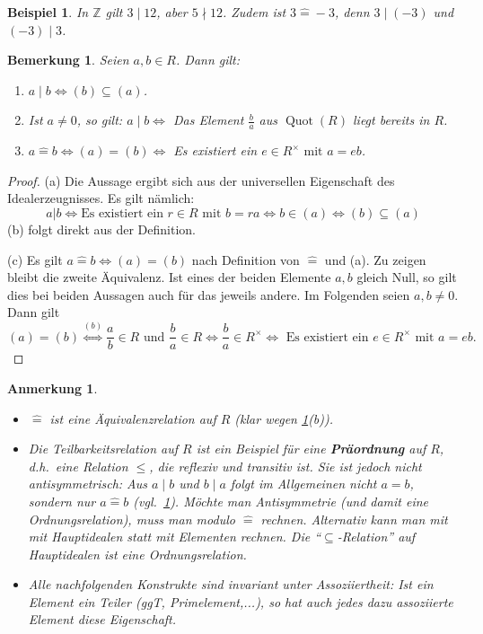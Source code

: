 \documentclass[a4paper, twoside, 11pt, ngerman]{report}
\newcommand{\ZZ}{\mathds Z}
\newcommand{\assoc}{\mathrel{\widehat{=}}}
\DeclareMathOperator{\Quot}{Quot}
\theoremstyle{definistyle}
\newtheorem{bem}[satz]{Bemerkung}
\newtheorem{anm}[satz]{Anmerkung}
\newtheorem{bsp}[satz]{Beispiel}
\theoremstyle{remark}
\newcommand{\defn}[1]{\textit{\bfseries #1}}
\begin{document}
\begin{bsp}\label{bsp:teilbarkeit}
In $\ZZ$ gilt $3 \mid 12$, aber $5 \nmid 12$. Zudem ist $3 \assoc -3$, denn $3 \mid (-3)$ und $(-3) \mid 3$.
\end{bsp}

\begin{bem}\label{bem:teiler_assoziiert}
Seien $a, b \in R$. Dann gilt:
\begin{enumerate}[label=(\alph*)]
    \item $a \mid b \iff (b) \subseteq (a)$. 
    \item Ist $a\neq 0$, so gilt: $a\mid b \iff$ Das Element $\frac{b}{a}$ aus $\Quot(R)$ liegt bereits in $R$.
    \item $a \assoc b \iff (a) = (b) \iff $ Es existiert ein $e \in R^\times \text{ mit } a = e b$.
\end{enumerate}
\end{bem}

\begin{proof}
(a) Die Aussage ergibt sich aus der universellen Eigenschaft des Idealerzeugnisses. Es gilt nämlich:
\[
a|b\iff \text{Es existiert ein } r\in R \text { mit } b= ra \iff b \in (a) \iff (b)\subseteq (a)
\]
(b) folgt direkt aus der Definition.

(c) Es gilt $a \assoc b \iff (a) = (b)$ nach Definition von $\assoc$ und (a). Zu zeigen bleibt die zweite Äquivalenz. Ist eines der beiden Elemente $a,b$ gleich Null, so gilt dies bei beiden Aussagen auch für das jeweils andere. Im Folgenden seien $a,b\neq0$. Dann gilt
\[
(a)=(b)\overset{(b)}{\iff}\frac{a}{b}\in R\text{ und } \frac{b}{a}\in R\iff \frac{b}{a}\in R^\times
\iff \text{ Es existiert ein } e\in R^\times \text{ mit } a=eb.
\]
\end{proof}

\begin{anm}\label{anm:assoziiert_teilbarkeit}
\begin{itemize}
    \item $\assoc$ ist eine Äquivalenzrelation auf $R$ (klar wegen \ref{bem:teiler_assoziiert}(b)).
    \item Die Teilbarkeitsrelation auf $R$ ist ein Beispiel für eine \defn{Präordnung} auf $R$, d.h.\ eine Relation $\leq$, die reflexiv und transitiv ist. Sie ist jedoch nicht antisymmetrisch: Aus $a \mid b$ und $b \mid a$ folgt im Allgemeinen nicht $a = b$, sondern nur $a \assoc b$ (vgl.\ \ref{bem:teiler_assoziiert}). Möchte man Antisymmetrie (und damit eine Ordnungsrelation), muss man modulo $\assoc$ rechnen.
    Alternativ kann man mit mit Hauptidealen statt mit Elementen rechnen. Die "`$\subseteq$-Relation"' auf Hauptidealen ist eine Ordnungsrelation.
    \item Alle nachfolgenden Konstrukte sind invariant unter Assoziiertheit: Ist ein Element ein Teiler (ggT, Primelement,...), so hat auch jedes dazu assoziierte Element diese Eigenschaft.
\end{itemize}
\end{anm}
\end{document}
